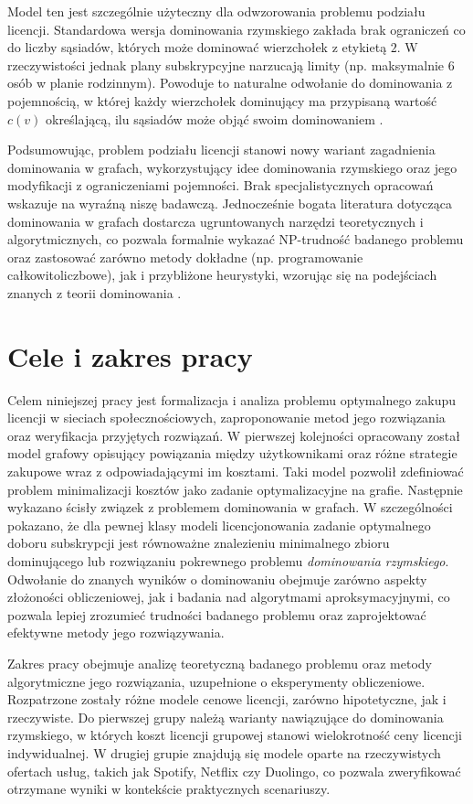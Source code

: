 Model ten jest szczególnie użyteczny dla odwzorowania problemu podziału licencji. Standardowa wersja dominowania rzymskiego zakłada brak ograniczeń co do liczby sąsiadów, których może dominować wierzchołek z etykietą $2$. W rzeczywistości jednak plany subskrypcyjne narzucają limity (np. maksymalnie $6$ osób w planie rodzinnym). Powoduje to naturalne odwołanie do dominowania z pojemnością, w której każdy wierzchołek dominujący ma przypisaną wartość $c(v)$ określającą, ilu sąsiadów może objąć swoim dominowaniem \cite{CapDom}.

Podsumowując, problem podziału licencji stanowi nowy wariant zagadnienia dominowania w grafach, wykorzystujący idee dominowania rzymskiego oraz jego modyfikacji z ograniczeniami pojemności. Brak specjalistycznych opracowań wskazuje na wyraźną niszę badawczą. Jednocześnie bogata literatura dotycząca dominowania w grafach dostarcza ugruntowanych narzędzi teoretycznych i algorytmicznych, co pozwala formalnie wykazać NP-trudność badanego problemu oraz zastosować zarówno metody dokładne (np. programowanie całkowitoliczbowe), jak i przybliżone heurystyki, wzorując się na podejściach znanych z teorii dominowania \cite{Roman2DominationSurvey, CapDom}.


\section{Cele i zakres pracy}
Celem niniejszej pracy jest formalizacja i analiza problemu optymalnego zakupu licencji w sieciach społecznościowych, zaproponowanie metod jego rozwiązania oraz weryfikacja przyjętych rozwiązań. W pierwszej kolejności opracowany został model grafowy opisujący powiązania między użytkownikami oraz różne strategie zakupowe wraz z odpowiadającymi im kosztami. Taki model pozwolił zdefiniować problem minimalizacji kosztów jako zadanie optymalizacyjne na grafie. Następnie wykazano ścisły związek z problemem dominowania w grafach. W szczególności pokazano, że dla pewnej klasy modeli licencjonowania zadanie optymalnego doboru subskrypcji jest równoważne znalezieniu minimalnego zbioru dominującego lub rozwiązaniu pokrewnego problemu \emph{dominowania rzymskiego}. Odwołanie do znanych wyników o dominowaniu obejmuje zarówno aspekty złożoności obliczeniowej, jak i badania nad algorytmami aproksymacyjnymi, co pozwala lepiej zrozumieć trudności badanego problemu oraz zaprojektować efektywne metody jego rozwiązywania.

Zakres pracy obejmuje analizę teoretyczną badanego problemu oraz metody algorytmiczne jego rozwiązania, uzupełnione o eksperymenty obliczeniowe. Rozpatrzone zostały różne modele cenowe licencji, zarówno hipotetyczne, jak i rzeczywiste. Do pierwszej grupy należą warianty nawiązujące do dominowania rzymskiego, w których koszt licencji grupowej stanowi wielokrotność ceny licencji indywidualnej. W drugiej grupie znajdują się modele oparte na rzeczywistych ofertach usług, takich jak Spotify, Netflix czy Duolingo, co pozwala zweryfikować otrzymane wyniki w kontekście praktycznych scenariuszy.


